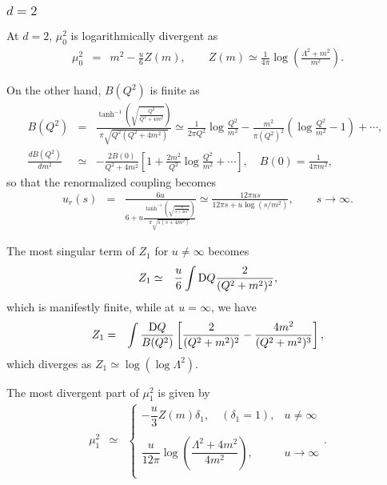 \documentclass[preprint]{ptephy_v1}%
\newcommand{\rmD}{{\rm D}}
\begin{document}
\subsubsection{$d=2$}
At $d=2$, 
$\mu_0^2$ is logarithmically divergent as
\begin{eqnarray}  
\mu_0^2 &= & m^2-\frac{u}{6} Z(m), \qquad Z(m)\simeq\frac{1}{ 4\pi} \log \left(\frac{\Lambda^2+m^2}{m^2} \right).
\end{eqnarray} 

On the other hand, $B(Q^2)$ is finite as 
\begin{eqnarray}  
B(Q^2) &=&  \frac{\tanh^{-1}\left(\sqrt{\frac{Q^2}{Q^2+4m^2}}\right)}{\pi \sqrt{Q^2(Q^2+4m^2)}} 
\simeq\frac{1}{2\pi Q^2}\log\frac{Q^2}{m^2} -\frac{m^2}{\pi (Q^2)^2}\left(\log \frac{Q^2}{m^2}-1\right)+\cdots,~~
 \\
\frac{d B(Q^2)}{d m^2} &\simeq& -\frac{2 B(0)}{Q^2 +4m^2}\left[1+\frac{2m^2}{Q^2} \log\frac{Q^2}{m^2}+\cdots\right],
\quad B(0) =\frac{1}{4\pi m^2},
\end{eqnarray} 
so that the renormalized coupling becomes 
\begin{eqnarray} 
u_r(s) &=& \frac{6u}{\displaystyle 6 +u \frac{\tanh^{-1}\left(\sqrt{\frac{s}{s+4m^2}}\right)}{\pi \sqrt{s(s+4m^2)}} } \simeq \frac{12\pi u s}{12\pi s +u \log (s/m^2)}, \qquad s\rightarrow\infty .
\end{eqnarray} 

The most singular term of $Z_1$ for $u\not=\infty$ becomes
\begin{eqnarray}
Z_1 &\simeq&\frac{u}{6} \int {\rmD} Q \frac{2}{(Q^2+m^2)^2},
\end{eqnarray}
which is manifestly finite, while at $u=\infty$, we have
\begin{eqnarray}
Z_1 &=& \int \frac{\rmD Q}{B(Q^2)}\left[\frac{2}{(Q^2+m^2)^2} -\frac{4 m^2}{ (Q^2+m^2)^3}\right],
\end{eqnarray} 
which  diverges  as $Z_1 \simeq  \log\left(\log \Lambda^2\right)$.

The most divergent part of $\mu_1^2$ is given by
\begin{eqnarray}
\mu^2_1 &\simeq&  \left\{
\begin{array}{ll}
-\dfrac{u}{3} Z(m)\delta_1, \quad  (\delta_1=1),  & u \not= \infty \\
\\
 \dfrac{u}{12\pi}\log \left(\dfrac{\Lambda^2+4m^2}{4m^2}\right) , & u\to\infty \\
\end{array}
\right. .
\end{eqnarray}
\end{document}
